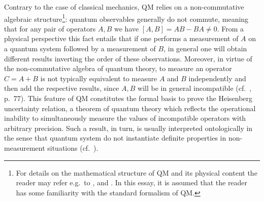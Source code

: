 \documentclass[11pt, executivepaper]{article}
\begin{document}
Contrary to the case of classical mechanics, QM relies on a non-commutative algebraic structure\footnote{For details on the mathematical structure of QM and its physical content the reader may refer e.g.\ to \cite{Sakurai1994}, and \cite{Griffiths:2014}. In this essay, it is assumed that the reader has some familiarity with the standard formalism of QM.}: quantum observables generally do not commute, meaning that for any pair of operators $A,B$ we have $[A,B]=AB-BA\neq0$. From a physical perspective this fact entails that if one performs a measurement of $A$ on a quantum system followed by a measurement of $B$, in general one will obtain different results inverting the order of these observations. Moreover, in virtue of the non-commutative algebra of quantum theory, to measure an operator $C=A+B$ is not typically equivalent to measure $A$ and $B$ independently and then add the respective results, since $A,B$ will be in general incompatible (cf.\ \cite{David:2015}, p.\ 77). This feature of QM constitutes the formal basis to prove the Heisenberg uncertainty relation, a theorem of quantum theory which reflects the operational inability to simultaneously measure the values of incompatible operators with arbitrary precision. Such a result, in turn, is usually interpreted ontologically in the sense that quantum system do not instantiate definite properties in non-measurement situations (cf.\ \cite{Sakurai1994}).
\end{document}
